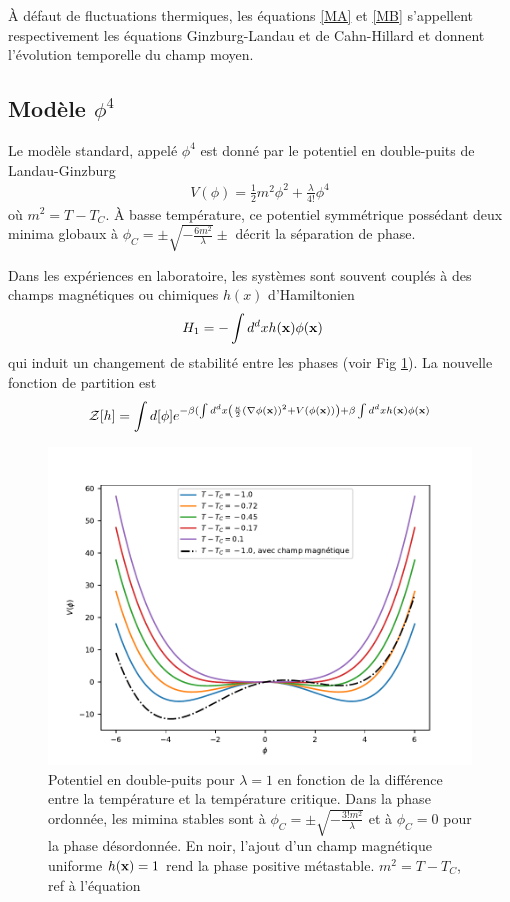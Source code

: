 À défaut de fluctuations thermiques, les équations \ref{MA} et \ref{MB} s'appellent respectivement les équations Ginzburg-Landau et de Cahn-Hillard \cite{cahn_free_nodate,langer_new_1975,kawasaki_growth_1978} et donnent l'évolution temporelle du champ moyen. 

    \subsection{Modèle $\phi^4$}
    
Le modèle standard, appelé $\phi^4$ est donné par le potentiel en double-puits de Landau-Ginzburg \cite[§ 45]{l_landau_physique_1990} 
\begin{align}
    V(\phi) = \frac{1}{2} m^2 \phi^2 + \frac{\lambda}{4!} \phi^4
    \label{phi4}
\end{align} 
où $m^2 = T-T_C$. À basse température, ce potentiel symmétrique possédant deux minima globaux à $\phi_C = \pm \sqrt{- \frac{6 m^2}{\lambda} } \pm$ décrit la séparation de phase.


Dans les expériences en laboratoire, les systèmes sont souvent couplés à des champs magnétiques ou chimiques $h(x)$ d'Hamiltonien
\begin{align}
    H_1 &= - \int d^dx h({\bf x})\phi({\bf x})
    \label{champ-externe}
\end{align}
qui induit un changement de stabilité entre les phases (voir Fig \ref{double-puits-temperature}). La nouvelle fonction de partition est
\begin{align}
    \mathcal{Z}[h] = \int d [\phi] e^{ - \beta (\int d^d x \left( \frac{\kappa}{2} (\nabla \phi({\bf x}))^2 + V(\phi({\bf x})) \right) + \beta \int d^d x h({\bf x}) \phi({\bf x})}
\end{align}

\begin{figure}
    \centering
    \includegraphics[width=0.6\linewidth]{intro/double-puit-en-fonction-temp.pdf}
    \caption{Potentiel en double-puits pour $\lambda=1$ en fonction de la différence entre la température et la température critique. Dans la phase ordonnée, les mimina stables sont à $\phi_C =\pm \sqrt{- \frac{3! m^2}{\lambda} } $ et à $\phi_C = 0$ pour la phase désordonnée. En noir, l'ajout d'un champ magnétique uniforme $h({\bf x}) = 1$ rend la phase positive métastable. {\color{red} $m^2 = T-T_C$, ref à l'équation}}
    \label{double-puits-temperature}
\end{figure}

